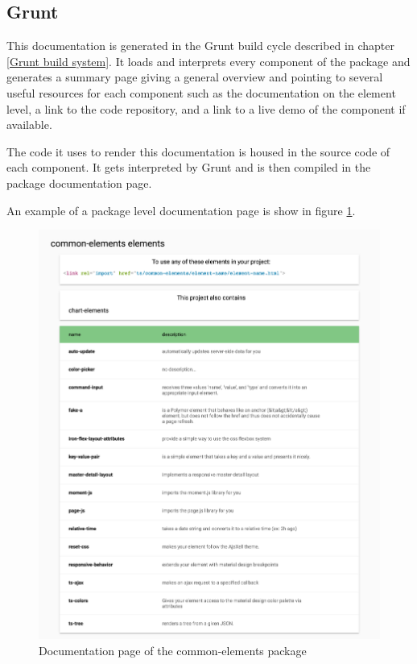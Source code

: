 \subsection{Grunt}
This documentation is generated in the Grunt build cycle described in chapter
\ref{Grunt build system}.
It loads and interprets every component of the package and generates a summary
page giving a general overview and pointing to several useful resources for each
component such as the documentation on the element level, a link to the code
repository, and a link to a live demo of the component if available.

The code it uses to render this documentation is housed in the source code of
each component. It gets interpreted by Grunt and is then compiled in the package
documentation page.

An example of a package level documentation page is show in figure \ref{fig:packagedocumentation}.
\begin{figure}
  \centering
  \includegraphics[width=\textwidth]{images/package-documentation}
  \caption{Documentation page of the common-elements package}
  \label{fig:packagedocumentation}
\end{figure}

